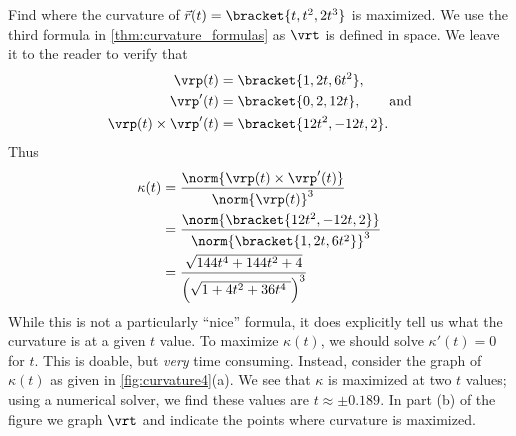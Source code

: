 \begin{example}\label{ex_curvature4}
Find where the curvature of $\vec r(t) =\bracket{t, t^2, 2t^3}$ is maximized.
\solution
We use the third formula in \autoref{thm:curvature_formulas} as $\vrt$ is defined in space. We leave it to the reader to verify that 
\begin{align*}
 \vrp(t) &=\bracket{1,2t,6t^2},\\
 \vrp'(t) &=\bracket{0,2,12t},\qquad \text{and}\\
 \vrp(t)\times \vrp'(t) &=\bracket{12t^2,-12t,2}.
\end{align*}
Thus 
\begin{align*}
\kappa(t) &= \frac{\norm{\vrp(t)\times\vrp'(t)}}{\norm{\vrp(t)}^3} \\
	&= \frac{\norm{\bracket{12t^2,-12t,2}}}{\norm{\bracket{1,2t,6t^2}}^3} \smallskip\\
	&= \frac{\sqrt{144t^4+144t^2+4}}{\Bigl(\sqrt{1+4t^2+36t^4\ }\Bigr)^3}
\end{align*}
%
While this is not a particularly ``nice'' formula, it does explicitly tell us what the curvature is at a given $t$ value. To maximize $\kappa(t)$, we should solve $\kappa'(t)=0$ for $t$. This is doable, but \emph{very} time consuming. Instead, consider the graph of $\kappa(t)$ as given in \autoref{fig:curvature4}(a). We see that $\kappa$ is maximized at two $t$ values; using a numerical solver, we find these values are $t\approx\pm 0.189$. In part (b) of the figure we graph $\vrt$ and indicate the points where curvature is maximized.
\end{example}

